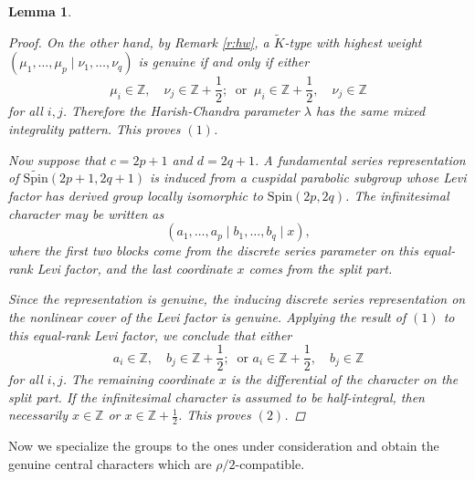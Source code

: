 \documentclass{amsart}
\newcommand{\Spin}{{\mathrm{Spin}}}
\newtheorem{lemma}[thm]{Lemma}
\theoremstyle{definition}
\begin{document}
\begin{lemma}
\begin{proof}
On the other hand, by Remark \ref{r:hw}, a $\widetilde K$-type with highest weight
$(\mu_1,\ldots,\mu_p\mid \nu_1,\ldots,\nu_q)$ is genuine if and only if either
\begin{equation*}
\mu_i\in\mathbb Z,\quad \nu_j\in\mathbb Z+\frac12 ; \ \text{ or } \ 
\mu_i\in\mathbb Z+\frac12,\quad \nu_j\in\mathbb Z
\end{equation*}
for all $i,j$. Therefore the Harish-Chandra parameter $\lambda$ has the same mixed integrality pattern. This proves $(1)$.

Now suppose that $c=2p+1$ and $d=2q+1$. A fundamental series representation of $\widetilde{\Spin}(2p+1,2q+1)$ is induced from a cuspidal parabolic subgroup whose Levi factor has derived group locally isomorphic to $\Spin(2p,2q)$. The infinitesimal character may be written as
\begin{equation*}
(a_1,\ldots,a_p\mid b_1,\ldots,b_q\mid x),
\end{equation*}
where the first two blocks come from the discrete series parameter on this equal-rank Levi factor, and the last coordinate $x$ comes from the split part.

Since the representation is genuine, the inducing discrete series representation on the nonlinear cover of the Levi factor is genuine. Applying the result of $(1)$ to this equal-rank Levi factor, we conclude that either
\begin{equation*}
a_i\in\mathbb Z,\quad b_j\in\mathbb Z+\frac12;  \   \text{ or }
a_i\in\mathbb Z+\frac12,\quad b_j\in\mathbb Z
\end{equation*}
for all $i,j$. The remaining coordinate $x$ is the differential of the character on the split part. If the infinitesimal character is assumed to be half-integral, then necessarily $x\in\mathbb Z$ or $x\in\mathbb Z+\frac12$. This proves $(2)$.
\end{proof}

\end{lemma}

Now we specialize the groups to the ones under consideration and obtain the genuine central characters which are $\rho/2$-compatible.
\end{document}
